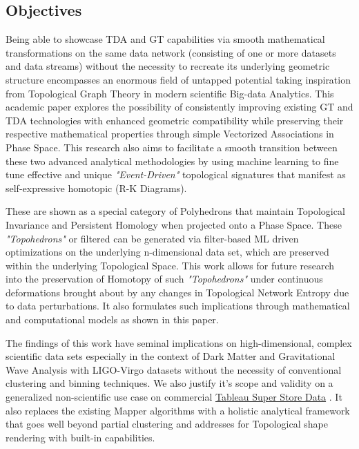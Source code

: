 \subsection{Objectives}

Being able to showcase TDA and GT capabilities via smooth mathematical transformations on the same data network (consisting of one or more datasets and data streams) without the necessity to recreate its underlying geometric structure encompasses an enormous field of untapped potential taking inspiration from Topological Graph Theory \cite{17.0_2001TGTIntro} \cite{17.1_2012foundationsTGT}  in modern scientific Big-data Analytics.\cite{02.6_2009TDAChallenges}\cite{18.0_2016topologicalBigChem} \cite{18.2_2018TDAonBigData} This academic paper explores the possibility of consistently improving existing GT and TDA technologies with enhanced geometric compatibility while preserving their respective mathematical properties through simple Vectorized Associations in Phase Space.\cite{19.0_2010PhaseSpace} This research also aims to facilitate a smooth transition between these two advanced analytical methodologies by using machine learning to fine tune effective and unique \textit{"Event-Driven"} topological signatures that manifest as self-expressive homotopic\cite{07_bjorner2003Homotopy} \cite{03.1_2009simplicialHomotopy}  (R-K Diagrams).

These are shown as a special category of Polyhedrons that maintain Topological Invariance\cite{12.1_2002topologicalInvariaceProjection} \cite{01.0_2010introductionTopoPropertiesInvariance} and Persistent Homology when projected onto a Phase Space. These \textit{"Topohedrons"} or filtered  can be generated via filter-based ML driven optimizations on the underlying n-dimensional data set, which are preserved within the underlying Topological Space. This work allows for future research into the preservation of Homotopy of such \textit{"Topohedrons"} under continuous deformations brought about by any changes in Topological Network Entropy due to data perturbations. It also formulates such implications through mathematical and computational models as shown in this paper.\cite{05.1_2007computingTopoEntropy}

The findings of this work have seminal implications on high-dimensional, complex scientific data sets especially in the context of Dark Matter and Gravitational Wave  Analysis\cite{00_LIGOOpenSciData} \cite{00.1_2012GWAnalysisFormalism} with LIGO-Virgo datasets without the necessity of conventional clustering and binning techniques. \cite{00.2_schutz2012GWDataAnalysis}We also justify it's scope and validity on a generalized non-scientific use case on commercial \hyperref[sec:store_sales_section]{Tableau Super Store Data}
. It also replaces the existing Mapper algorithms \cite{01.9_2007MapperPBG} with a holistic analytical framework that goes well beyond partial clustering and addresses \textbf{\textit{}} \cite{01.1_1stCourse2018algebraicTopo} \cite{06.4_2005computingPHomology} for Topological shape rendering with built-in  \textbf{\textit{}} capabilities.\cite{01.0_2010introductionTopoPropertiesInvariance} \cite{21.0_2016TopoCompression} \cite{12.2_compressingTopoNetworkGraphs}

